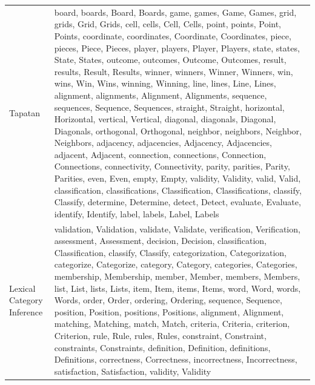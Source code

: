 \begin{footnotesize}
\begin{tabular}{@{}lp{}@{}}
Tapatan & board, boards, Board, Boards, game, games, Game, Games, grid, grids, Grid, Grids, cell, cells, Cell, Cells, point, points, Point, Points, coordinate, coordinates, Coordinate, Coordinates, piece, pieces, Piece, Pieces, player, players, Player, Players, state, states, State, States, outcome, outcomes, Outcome, Outcomes, result, results, Result, Results, winner, winners, Winner, Winners, win, wins, Win, Wins, winning, Winning, line, lines, Line, Lines, alignment, alignments, Alignment, Alignments, sequence, sequences, Sequence, Sequences, straight, Straight, horizontal, Horizontal, vertical, Vertical, diagonal, diagonals, Diagonal, Diagonals, orthogonal, Orthogonal, neighbor, neighbors, Neighbor, Neighbors, adjacency, adjacencies, Adjacency, Adjacencies, adjacent, Adjacent, connection, connections, Connection, Connections, connectivity, Connectivity, parity, parities, Parity, Parities, even, Even, empty, Empty, validity, Validity, valid, Valid, classification, classifications, Classification, Classifications, classify, Classify, determine, Determine, detect, Detect, evaluate, Evaluate, identify, Identify, label, labels, Label, Labels \\[2pt]
Lexical Category Inference & validation, Validation, validate, Validate, verification, Verification, assessment, Assessment, decision, Decision, classification, Classification, classify, Classify, categorization, Categorization, categorize, Categorize, category, Category, categories, Categories, membership, Membership, member, Member, members, Members, list, List, lists, Lists, item, Item, items, Items, word, Word, words, Words, order, Order, ordering, Ordering, sequence, Sequence, position, Position, positions, Positions, alignment, Alignment, matching, Matching, match, Match, criteria, Criteria, criterion, Criterion, rule, Rule, rules, Rules, constraint, Constraint, constraints, Constraints, definition, Definition, definitions, Definitions, correctness, Correctness, incorrectness, Incorrectness, satisfaction, Satisfaction, validity, Validity \\[2pt]
\bottomrule
\end{tabular}
\end{footnotesize}
